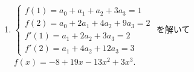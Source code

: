 \documentclass[11pt, uplatex, dvipdfmx]{jsarticle}
\begin{document}
\begin{enumerate}
\begin{enumerate}[(1)]
\[\begin{aligned}
                             \right] \bm{x}_3 = \left[
                             \begin{array}{r}
                               4\\
                               0
                             \end{array}
                             \right] \Leftrightarrow \bm{x}_3=\left[
                             \begin{array}{r}
                               4\\
                               0\\
                               0
                             \end{array}
                             \right] + c_3\left[
                             \begin{array}{r}
                               1\\
                               -2\\
                               1
                             \end{array}
                             \right]
      \end{aligned}
    \]
    より $X=\left[
      \begin{array}{rrr}
        7 & -4 & 4\\
        -5 & 5 & 0\\
        0 & 0 & 0
      \end{array}
    \right] + c_1 \left[
      \begin{array}{rrr}
        1 & 0 & 0\\
        -2 & 0 & 0\\
        1 & 0 & 0
      \end{array}
    \right] + c_2 \left[
      \begin{array}{rrr}
        0 & 1 & 0\\
        0 & -2 & 0\\
        0 & 1 & 0
      \end{array}
    \right] + c_3\left[
      \begin{array}{rrr}
        0 & 0 & 1\\
        0 & 0 & -2\\
        0 & 0 & 1
      \end{array}
    \right]$.
  \end{enumerate}

  
  
\item $\begin{cases}
  f(1) = a_0 + a_1 + a_2 + 3a_3=1\\
  f(2) = a_0 + 2a_1 + 4a_2 + 9a_3=2\\
  f'(1) = a_1+2a_2+3a_3=2\\
  f'(2) = a_1+4a_2+12a_3=3
\end{cases}$ を解いて $f(x) = -8 + 19x -13x^2+3x^3$.


\end{enumerate}
\end{document}
